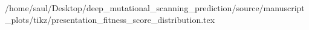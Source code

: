 /home/saul/Desktop/deep_mutational_scanning_prediction/source/manuscript_plots/tikz/presentation_fitness_score_distribution.tex